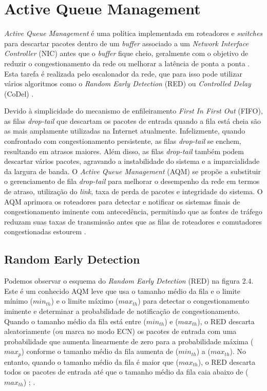\section{Active Queue Management}

\emph{Active Queue Management} é uma política implementada em roteadores e \emph{switches} para descartar pacotes dentro de um \emph{buffer} associado a um \emph{Network Interface Controller} (NIC) antes que o \emph{buffer} fique cheio, geralmente com o objetivo de reduzir o congestionamento da rede ou melhorar a latência de ponta a ponta \cite{adams2012active}. Esta tarefa é realizada pelo escalonador da rede, que para isso pode utilizar vários algoritmos como o \emph{Random Early Detection} (RED) \cite{floyd1993random} ou \emph{Controlled Delay} (CoDel) \cite{nichols2012controlling}.

Devido à simplicidade do mecanismo de enfileiramento \emph{First In First Out} (FIFO), as filas \emph{drop-tail} que descartam os pacotes de entrada quando a fila está cheia são as mais amplamente utilizadas na Internet atualmente. Infelizmente, quando confrontado com congestionamento persistente, as filas \emph{drop-tail} se enchem, resultando em atrasos maiores. Além disso, as filas \emph{drop-tail} também podem descartar vários pacotes, agravando a instabilidade do sistema e a imparcialidade da largura de banda. O \emph{Active Queue Management} (AQM) se propõe a substituir o gerenciamento de fila \emph{drop-tail} para melhorar o desempenho da rede em termos de atraso, utilização do \emph{link}, taxa de perda de pacotes e integridade do sistema. O AQM aprimora os roteadores para detectar e notificar os sistemas finais de congestionamento iminente com antecedência, permitindo que as fontes de tráfego reduzam suas taxas de transmissão antes que as filas de roteadores e comutadores congestionadas estourem \cite{chung2003analysis}.

\subsection{Random Early Detection}

Podemos observar o esquema do \emph{Random Early Detection} (RED) na figura 2.4. Este é um conhecido AQM leve que usa o tamanho médio da fila e o limite mínimo ({$\mathit{min}_\mathit{th}$}) e o limite máximo ({$\mathit{max}_\mathit{th}$}) para detectar o congestionamento iminente e determinar a probabilidade de notificação de congestionamento. Quando o tamanho médio da fila está entre ({$\mathit{min}_\mathit{th}$}) e ({$\mathit{max}_\mathit{th}$}), o RED descarta aleatoriamente (ou marca no modo ECN) os pacotes de entrada com uma probabilidade que aumenta linearmente de zero para a probabilidade máxima ({$\mathit{max}_\mathit{p}$}) conforme o tamanho médio da fila aumenta de ({$\mathit{min}_\mathit{th}$}) a ({$\mathit{max}_\mathit{th}$}). No entanto, quando o tamanho médio da fila é maior que ({$\mathit{max}_\mathit{th}$}), o RED descarta todos os pacotes de entrada até que o tamanho médio da fila caia abaixo de ({$\mathit{max}_\mathit{th}$}) \cite{floyd1993random}; \cite{lochin2011managing}.

